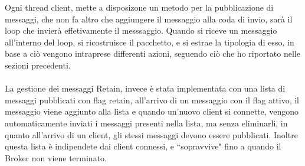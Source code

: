 \documentclass{article}
\begin{document}
Ogni thread client, mette a disposizone un metodo per la pubblicazione di messaggi, che non fa altro che aggiungere il messaggio alla coda di invio, sarà il loop che invierà effetivamente il messsaggio. Quando si riceve un messaggio all'interno del loop, si ricostruisce il pacchetto, e si estrae la tipologia di esso, in base a ciò vengono intraprese differenti azioni, seguendo ciò che ho riportato nelle sezioni precedenti.\\\\
La gestione dei messaggi Retain, invece è stata implementata con una lista di messaggi pubblicati con flag retain, all'arrivo di un messaggio con il flag attivo, il messaggio viene aggiunto alla lista e quando un'nuovo client si connette, vengono automaticamente inviati i messaggi presenti nella lista, ma senza eliminarli, in quanto all'arrivo di un client, gli stessi messaggi devono essere pubblicati. Inoltre questa lista è indipendete dai client connessi, e ``sopravvive" fino a quando il Broker non viene terminato.
\end{document}
